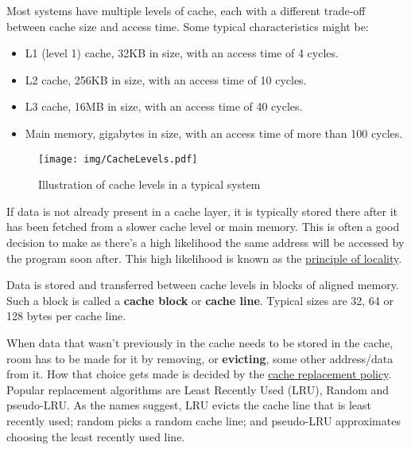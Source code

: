 \documentclass[
  a4paper,
]{report}
\providecommand{\tightlist}{%
  \setlength{\itemsep}{0pt}\setlength{\parskip}{0pt}}
\begin{document}
Most systems have multiple levels of cache,
each with a different trade-off between cache size and
access time. Some typical characteristics might
be:

\begin{itemize}
\tightlist
\item
  L1 (level 1) cache, 32KB in size, with an access time of 4 cycles.
\item
  L2 cache, 256KB in size, with an access time of 10 cycles.
\item
  L3 cache, 16MB in size, with an access time of 40 cycles.
\item
  Main memory, gigabytes in size, with an access time of more than 100
  cycles.
\end{itemize}

\begin{figure}
\centering
\texttt{[image: img/CacheLevels.pdf]}
\caption{Illustration of cache levels in a typical system}
\end{figure}

If data is not already present in a cache layer, it is typically stored
there after it has been fetched from a slower cache level or main
memory. This is often a good decision to make as there's a high
likelihood the same address will be accessed by the program soon after.
This high likelihood is known as the
\href{https://en.wikipedia.org/wiki/Locality_of_reference}{principle of
locality}.

Data is stored and transferred between cache levels in blocks of aligned
memory. Such a block is called a \textbf{cache block}
or \textbf{cache line}. Typical sizes are 32, 64 or
128 bytes per cache line.

When data that wasn't previously in the cache needs to be stored in the
cache, room has to be made for it by removing, or
\textbf{evicting}, some other address/data from
it. How that choice gets made is decided by the
\href{https://en.wikipedia.org/wiki/Cache_replacement_policies}{cache
replacement policy}. Popular replacement algorithms are Least Recently
Used (LRU),
Random and
pseudo-LRU. As the names suggest,
LRU evicts the cache line that is least recently used; random picks a
random cache line; and pseudo-LRU approximates choosing the least
recently used line.
\end{document}
